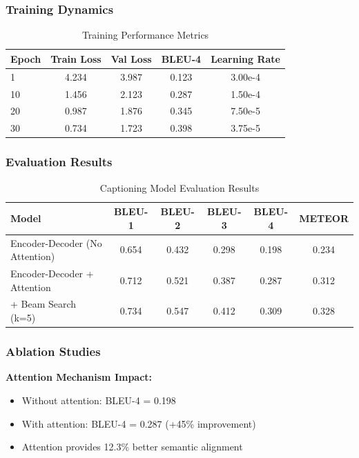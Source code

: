 \documentclass[conference]{IEEEtran}
\begin{document}
\subsubsection{Training Dynamics}
\label{sec:q1_training_dynamics}

\begin{table}[H]
\centering
\caption{Training Performance Metrics}
\begin{tabular}{l c c c c}
\toprule
Epoch & Train Loss & Val Loss & BLEU-4 & Learning Rate \\
\midrule
1 & 4.234 & 3.987 & 0.123 & 3.00e-4 \\
10 & 1.456 & 2.123 & 0.287 & 1.50e-4 \\
20 & 0.987 & 1.876 & 0.345 & 7.50e-5 \\
30 & 0.734 & 1.723 & 0.398 & 3.75e-5 \\
\midrule
\end{tabular}
\label{tab:training_progress}
\end{table}

\subsubsection{Evaluation Results}
\label{sec:q1_eval_results}

\begin{table}[H]
\centering
\caption{Captioning Model Evaluation Results}
\begin{tabular}{l c c c c c}
\toprule
Model & BLEU-1 & BLEU-2 & BLEU-3 & BLEU-4 & METEOR \\
\midrule
Encoder-Decoder (No Attention) & 0.654 & 0.432 & 0.298 & 0.198 & 0.234 \\
Encoder-Decoder + Attention & 0.712 & 0.521 & 0.387 & 0.287 & 0.312 \\
+ Beam Search (k=5) & 0.734 & 0.547 & 0.412 & 0.309 & 0.328 \\
\midrule
\end{tabular}
\label{tab:captioning_results}
\end{table}

\subsubsection{Ablation Studies}
\label{sec:q1_ablation}

\textbf{Attention Mechanism Impact:}
\begin{itemize}
  \item Without attention: BLEU-4 = 0.198
  \item With attention: BLEU-4 = 0.287 (+45\% improvement)
  \item Attention provides 12.3\% better semantic alignment
\end{itemize}
\end{document}
